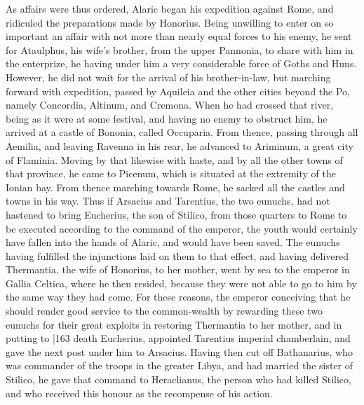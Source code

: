As affairs were thus ordered, Alaric began his expedition against Rome, and ridiculed the preparations made by Honorius. Being unwilling to enter on so important an affair with not more than nearly equal forces to his enemy, he sent for Ataulphus, his wife's brother, from the upper Pannonia, to share with him in
the enterprize, he having under him a very considerable force of Goths and Huns. However, he did not wait for the arrival of his brother-in-law, but marching forward with expedition, passed by Aquileia and the other cities beyond the Po, namely Concordia, Altinum, and Cremona. When he had crossed that river, being as it were at some festival, and having no enemy to obstruct him, he arrived at a castle of Bononia, called Occuparia. From thence,
passing through all Aemilia, and leaving Ravenna in his rear, he advanced to Ariminum, a great city of Flaminia. Moving by that likewise with haste, and by all the other towns of that province, he came to Picenum, which is situated at the extremity of the Ionian bay. From thence marching towards Rome, he sacked all the castles and towns in his way. Thus if Arsacius and
Tarentius, the two eunuchs, had not hastened to bring Eucherius, the son of Stilico, from those quarters to Rome to be executed according to the command of the emperor, the youth would certainly have fallen into the hands of Alaric, and would have been saved. The eunuchs having fulfilled the injunctions laid on them to that effect, and having delivered Thermantia, the wife of Honorius, to her mother, went by sea to the emperor in Gallia Celtica, where he then resided, because they were not able to go to him by the same way they had come. For these reasons, the emperor conceiving that he should render good service to the common-wealth by rewarding these two eunuchs for their great exploits in restoring Thermantia to her mother, and in putting to
|163 death Eucherius, appointed Tarentius imperial chamberlain, and gave the next post under him to Arsacius. Having then cut off Bathanarius, who was commander of the troops in the greater Libya, and had married the sister of Stilico, he gave that command to Heraclianus, the person who had killed Stilico, and who received this honour as the recompense of his action.


